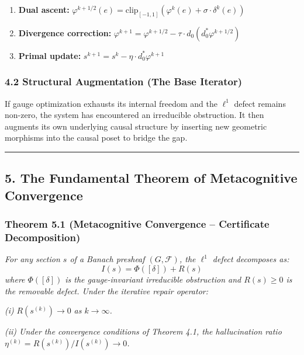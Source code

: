 \documentclass[
]{article}
\providecommand{\tightlist}{%
  \setlength{\itemsep}{0pt}\setlength{\parskip}{0pt}}
\begin{document}
\begin{enumerate}
\def\labelenumi{\arabic{enumi}.}
\tightlist
\item
  \textbf{Dual ascent:}
  \(\varphi^{k+1/2}(e) = \text{clip}_{[-1,1]}(\varphi^k(e) + \sigma \cdot \delta^k(e))\)
\item
  \textbf{Divergence correction:}
  \(\varphi^{k+1} = \varphi^{k+1/2} - \tau \cdot d_0(d_0^* \varphi^{k+1/2})\)
\item
  \textbf{Primal update:}
  \(s^{k+1} = s^k - \eta \cdot d_0^* \varphi^{k+1}\)
\end{enumerate}

\subsubsection{4.2 Structural Augmentation (The Base
Iterator)}\label{structural-augmentation-the-base-iterator}

If gauge optimization exhausts its internal freedom and the \(\ell^1\)
defect remains non-zero, the system has encountered an irreducible
obstruction. It then augments its own underlying causal structure by
inserting new geometric morphisms into the causal poset to bridge the
gap.

\begin{center}\rule{0.5\linewidth}{0.5pt}\end{center}

\subsection{5. The Fundamental Theorem of Metacognitive
Convergence}\label{the-fundamental-theorem-of-metacognitive-convergence}

\subsubsection{Theorem 5.1 (Metacognitive Convergence -- Certificate
Decomposition)}\label{theorem-5.1-metacognitive-convergence-certificate-decomposition}

\emph{For any section \(s\) of a Banach presheaf \((G, \mathcal{F})\),
the \(\ell^1\) defect decomposes as:} \[I(s) = \Phi([\delta]) + R(s)\]
\emph{where \(\Phi([\delta])\) is the gauge-invariant irreducible
obstruction and \(R(s) \geq 0\) is the removable defect. Under the
iterative repair operator:}

\emph{(i)} \(R(s^{(k)}) \to 0\) \emph{as \(k \to \infty\).}

\emph{(ii) Under the convergence conditions of Theorem 4.1, the
hallucination ratio \(\eta^{(k)} = R(s^{(k)}) / I(s^{(k)}) \to 0\).}
\end{document}

